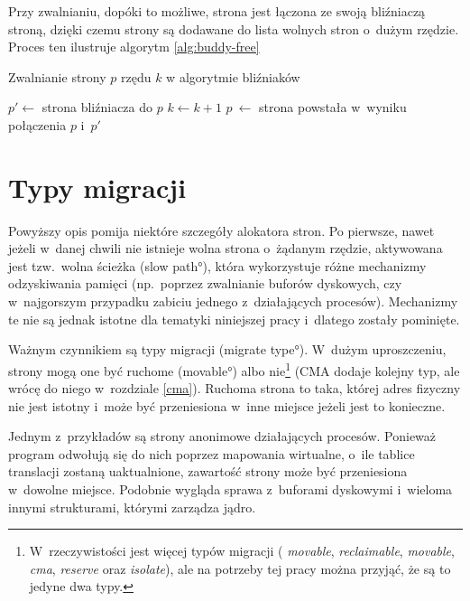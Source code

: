 Przy zwalnianiu, dopóki to możliwe, strona jest łączona ze swoją
bliźniaczą stroną, dzięki czemu strony są dodawane do lista wolnych
stron o~dużym rzędzie.  Proces ten ilustruje algorytm
\ref{alg:buddy-free}

\begin{algorithm}
\caption{Zwalnianie strony $p$ rzędu $k$ w algorytmie bliźniaków}
\label{alg:buddy-free}
\begin{algorithmic}[1]
        \State $p' \gets$ strona bliźniacza do $p$
            \State $k \gets k + 1$
            \State $p~\gets$ strona powstała w~wyniku połączenia $p$ i~$p'$
        \Else
        \EndIf
    \EndWhile
\EndProcedure
\end{algorithmic}
\end{algorithm}


\section{Typy migracji}

Powyższy opis pomija niektóre szczegóły alokatora stron.  Po pierwsze,
nawet jeżeli w~danej chwili nie istnieje wolna strona o~żądanym
rzędzie, aktywowana jest tzw.\ wolna ścieżka (\ang{slow path}), która
wykorzystuje różne mechanizmy odzyskiwania pamięci (np.\ poprzez
zwalnianie buforów dyskowych, czy w~najgorszym przypadku zabiciu
jednego z~działających procesów).  Mechanizmy te nie są jednak istotne
dla tematyki niniejszej pracy i~dlatego zostały pominięte.

Ważnym czynnikiem są typy migracji (\ang{migrate type}).  W~dużym
uproszczeniu, strony mogą one być ruchome (\ang{movable}) albo
nie\footnote{W~rzeczywistości jest więcej typów migracji ({\it
    movable}, {\it reclaimable}, {\it movable}, {\it cma}, {\it
    reserve} oraz {\it isolate}), ale na potrzeby tej pracy można
  przyjąć, że są to jedyne dwa typy.} (CMA dodaje kolejny typ, ale
wrócę do niego w~rozdziale \ref{cma}). Ruchoma strona to taka, której
adres fizyczny nie jest istotny i~może być przeniesiona w~inne miejsce
jeżeli jest to konieczne.

Jednym z~przykładów są strony anonimowe działających procesów.
Ponieważ program odwołują się do nich poprzez mapowania wirtualne,
o~ile tablice translacji zostaną uaktualnione, zawartość strony może
być przeniesiona w~dowolne miejsce.  Podobnie wygląda sprawa
z~buforami dyskowymi i~wieloma innymi strukturami, którymi zarządza
jądro.

